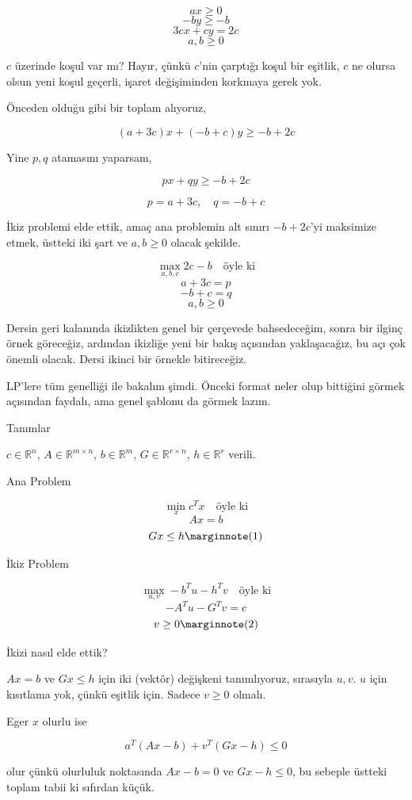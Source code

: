 \documentclass[12pt,fleqn]{article}\usepackage{../../common}
\begin{document}
$$
a x \ge 0
$$
$$
-by \ge -b
$$
$$
3cx + cy = 2c
$$
$$
a,b \ge 0
$$


$c$ üzerinde koşul var mı? Hayır, çünkü $c$'nin çarptığı koşul bir eşitlik,
$c$ ne olursa olsun yeni koşul geçerli, işaret değişiminden korkmaya gerek
yok.

Önceden olduğu gibi bir toplam alıyoruz, 

$$
(a+3c) x + (-b+c)y \ge -b + 2c
$$

Yine $p,q$ atamasını yaparsam,

$$
p x + q y \ge -b + 2c
$$

$$
p = a+3c, \quad q = -b + c 
$$

İkiz problemi elde ettik, amaç ana problemin alt sınırı $-b+2c$'yi maksimize
etmek, üstteki iki şart ve $a,b \ge 0$ olacak şekilde. 

$$
\max_{a,b,c} 2c - b \quad \textrm{öyle ki}
$$
$$
a + 3c = p
$$
$$
-b + c = q
$$
$$
a,b \ge 0
$$

Dersin geri kalanında ikizlikten genel bir çerçevede bahsedeceğim, sonra 
bir ilginç örnek göreceğiz, ardından ikizliğe yeni bir bakış açısından
yaklaşacağız, bu açı çok önemli olacak. Dersi ikinci bir örnekle
bitireceğiz. 

LP'lere tüm genelliği ile bakalım şimdi. Önceki format neler olup bittiğini
görmek açısından faydalı, ama genel şablonu da görmek lazım. 

Tanımlar

$c \in \mathbb{R}^n$, 
$A \in \mathbb{R}^{m \times n}$, 
$b \in \mathbb{R}^m$,
$G \in \mathbb{R}^{r \times n}$, 
$h \in \mathbb{R}^r$ verili. 

Ana Problem

$$
\min_x c^T x \quad \textrm{öyle ki}
$$
$$
Ax = b
$$
$$
Gx \le h
\mlabel{1}
$$

İkiz Problem

$$
\max_{u,v} -b^T u - h^T v \quad \textrm{öyle ki}
$$
$$
-A^Tu - G^Tv = c
$$
$$
v \ge 0
\mlabel{2}
$$

İkizi nasıl elde ettik? 

$Ax = b$ ve $Gx \le h$ için iki (vektör) değişkeni tanımlıyoruz, sırasıyla
$u,v$. $u$ için kısıtlama yok, çünkü eşitlik için. Sadece $v \ge 0$
olmalı. 

Eger $x$ olurlu ise 

$$
a^T (Ax - b) + v^T (Gx-h) \le 0
$$

olur çünkü olurluluk noktasında $Ax - b=0$ ve $Gx-h \le 0$, bu sebeple
üstteki toplam tabii ki sıfırdan küçük.
\end{document}
